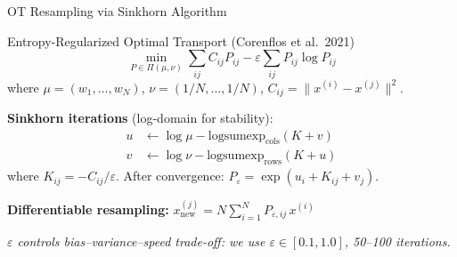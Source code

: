 \documentclass[aspectratio=169,10pt]{beamer}
\newcommand{\remark}[1]{\textcolor{jpmaccent}{\textit{#1}}}
\begin{document}
\begin{frame}{OT Resampling via Sinkhorn Algorithm}
\begin{block}{Entropy-Regularized Optimal Transport (Corenflos et al.\ 2021)}
\[
  \min_{P \in \Pi(\mu, \nu)} \sum_{ij} C_{ij} P_{ij} - \varepsilon \sum_{ij} P_{ij} \log P_{ij}
\]
where $\mu = (w_1, \ldots, w_N)$, $\nu = (1/N, \ldots, 1/N)$, $C_{ij} = \|x^{(i)} - x^{(j)}\|^2$.
\end{block}

\textbf{Sinkhorn iterations} (log-domain for stability):
\begin{align}
  u &\leftarrow \log \mu - \text{logsumexp}_\text{cols}(K + v) \\
  v &\leftarrow \log \nu - \text{logsumexp}_\text{rows}(K + u)
\end{align}
where $K_{ij} = -C_{ij}/\varepsilon$. After convergence: $P_\varepsilon = \exp(u_i + K_{ij} + v_j)$.

\vspace{0.3em}
\textbf{Differentiable resampling:}
$\displaystyle x_\text{new}^{(j)} = N \sum_{i=1}^{N} P_{\varepsilon,ij} \, x^{(i)}$

\vspace{0.3em}
\remark{$\varepsilon$ controls bias--variance--speed trade-off: we use $\varepsilon \in [0.1, 1.0]$, 50--100 iterations.}
\end{frame}
\end{document}
